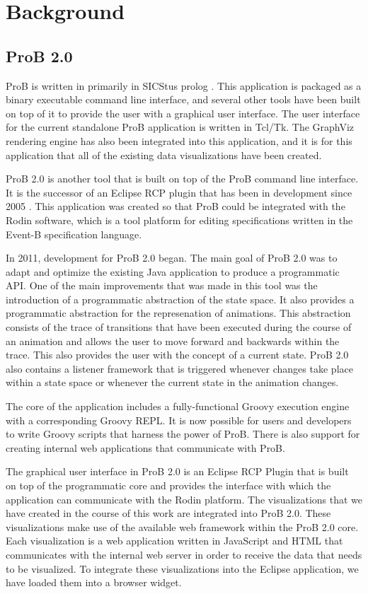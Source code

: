 \section{Background}

\subsection{ProB 2.0}

ProB is written in primarily in SICStus prolog \cite{LeBu08_225}. This application is packaged as a binary executable command line interface, and several other tools have been built on top of it to provide the user with a graphical user interface. The user interface for the current standalone ProB application is written in Tcl/Tk. The GraphViz rendering engine has also been integrated into this application, and it is for this application that all of the existing data visualizations have been created.

ProB 2.0 is another tool that is built on top of the ProB command line interface. It is the successor of an Eclipse RCP plugin that has been in development since 2005 \cite{BuHa07_292}. This application was created so that ProB could be integrated with the Rodin software, which is a tool platform for editing specifications written in the Event-B specification language.

In 2011, development for ProB 2.0 began. The main goal of ProB 2.0 was to adapt and optimize the existing Java application to produce a programmatic API. One of the main improvements that was made in this tool was the introduction of a programmatic abstraction of the state space. It also provides a programmatic abstraction for the represenation of animations. This abstraction consists of the trace of transitions that have been executed during the course of an animation and allows the user to move forward and backwards within the trace. This also provides the user with the concept of a current state. ProB 2.0 also contains a listener framework that is triggered whenever changes take place within a state space or whenever the current state in the animation changes.

The core of the application includes a fully-functional Groovy execution engine with a corresponding Groovy REPL. It is now possible for users and developers to write Groovy scripts that harness the power of ProB. There is also support for creating internal web applications that communicate with ProB. 

The graphical user interface in ProB 2.0 is an Eclipse RCP Plugin that is built on top of the programmatic core and provides the interface with which the application can communicate with the Rodin platform. The visualizations that we have created in the course of this work are integrated into ProB 2.0. These visualizations make use of the available web framework within the ProB 2.0 core. Each visualization is a web application written in JavaScript and HTML that communicates with the internal web server in order to receive the data that needs to be visualized. To integrate these visualizations into the Eclipse application, we have loaded them into a browser widget. 

